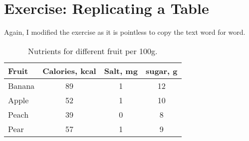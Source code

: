 \documentclass[12pt, titlepage]{article}
\begin{document}
\newpage
\section{Exercise: Replicating a Table}
Again, I modified the exercise as it is pointless to copy the text word for word.
\begin{table}[h]
    \centering
    \begin{tabular}{l | c c c}
        Fruit & Calories, kcal & Salt, mg & sugar, g \\ \hline
        Banana & 89 & 1 & 12 \\
        Apple & 52 & 1 & 10 \\
        Peach & 39 & 0 & 8 \\
        Pear & 57 & 1 & 9
    \end{tabular}
    \caption{Nutrients for different fruit per 100g.}
\end{table}
\end{document}
